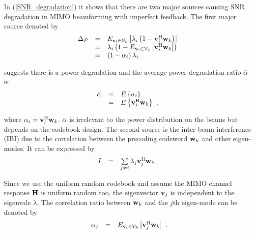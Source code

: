 \documentclass[a4paper,10pt,fleqn, twocolumn]{IEEEtran}
\newcommand{\bH}{{\bf H}}
\newcommand{\bv}{{\bf v}}
\newcommand{\bw}{{\bf w}}
\begin{document}
In (\ref{SNR_degradation}) it shows that there are two major
sources causing SNR degradation in MIMO beamforming with imperfect
feedback. The first major source denoted by
\begin{equation}
\begin{array}{rcl}
\Delta_{P}&=&\mbox{E}_{\bv_{i}\in{\cal
V}_{k}}\left|\lambda_{i}\left(1-\bv_{i}^{\rm
H}\bw_k\right)\right|\\
&=&\lambda_{i}\left(1-\mbox{E}_{\bv_{i}\in{\cal
V}_{k}}\left|\bv_{i}^{\rm H}\bw_k\right|\right)\\
&=&\left(1-\alpha_{i}\right)\lambda_{i}\\
\end{array}
\end{equation}

\noindent suggests there is a power degradation and the average
power degradation ratio $\bar{\alpha}_{}$ is
\begin{equation}
\begin{array}{rcl}
\bar{\alpha}_{}&=&\mbox{E}\left\{\alpha_{i}\right\}\\
&=&\mbox{E}\left\{\bv_{i}^{\rm H}\bw_k\right\}\ ,
\end{array}\label{alpha}
\end{equation}

\noindent where $\alpha_{i}=\bv_{i}^{\rm H}\bw_k$.
$\bar{\alpha}_{}$ is irrelevant to the power distribution on the
beams but depends on the codebook design. The second source is the
inter-beam interference (IBI) due to the correlation between the
precoding codeword $\bw_{k}$ and other eigen-modes. It can be
expressed by
\begin{equation}
\begin{array}{rcl}
I_{} & = & \sum\limits_{j\neq i}\lambda_{j}\bv_{j}^{\rm H}\bw_{k}\
\end{array}\label{IBI}
\end{equation}

\noindent  Since we use the uniform random codebook and assume the
MIMO channel response $\bH$ is uniform random too, the eigenvector
$\bv_{j}$ is independent to the eigenvale $\lambda$. The
correlation ratio between $\bw_{k}$ and the $j$th eigen-mode can
be denoted by
\begin{equation}
\begin{array}{rcl}
\alpha_{j}&=&\mbox{E}_{\bv_{i}\in{\cal V}_{k}}\left|\bv_{j}^{\rm
H}\bw_k\right|
\end{array}.\label{alpha_j}
\end{equation}
\end{document}
